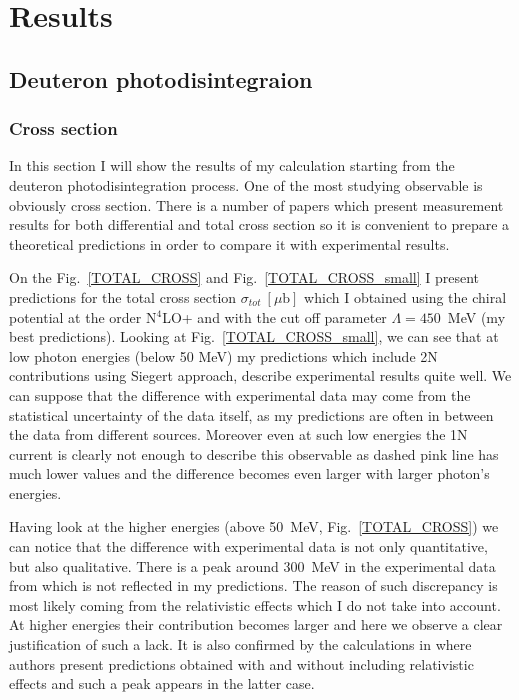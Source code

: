 \chapter{Results}

\section{Deuteron photodisintegraion}

    \subsection{Cross section}
    In this section I will show the results of my calculation starting from the
    deuteron photodisintegration process. One of the most
    studying observable is obviously cross section. There is
    a number of papers which present 
    measurement results for both differential and total cross section
    \cite{BOSMAN1979,ARENDS1984,Skopik1974, Moreh1989, Birenbaum1985, Bernabei1986, rachek2007,Ying_Experiment_Deut, DeSanctis_Experiment_Deut} so it is convenient 
    to prepare a theoretical predictions in order to compare 
    it with experimental results.

    On the Fig.~\ref{TOTAL_CROSS} and Fig.~\ref{TOTAL_CROSS_small} 
    I present predictions for the
    total cross section $\sigma_{tot}~[\mu\text{b}]$ which I obtained
    using the chiral potential at the order N$^4$LO+ and with 
    the cut off parameter $\Lambda=450$~MeV (my best predictions).
    Looking at Fig.~\ref{TOTAL_CROSS_small}, we can see that at low photon energies
    (below 50 MeV) my predictions which include 2N contributions
    using Siegert approach, describe experimental results quite well.
    We can suppose that the difference with experimental data may come from 
    the statistical uncertainty of  the data itself, as my predictions
    are often in between the data from different sources.
    Moreover even at such low energies the 1N current is clearly not enough
    to describe this observable as dashed pink line has much lower values and
    the difference becomes even larger with larger photon's energies. 

    Having look at the higher energies (above 50~MeV, Fig.~\ref{TOTAL_CROSS})
    we can notice that the difference with experimental data is not only 
    quantitative, but also qualitative.  There is a peak around 300~MeV
    in the experimental data from \cite{Bernabei1986} which is not
    reflected in my predictions. The reason of such discrepancy 
    is most likely coming from the relativistic effects
    which I do not take into account. At higher energies their contribution
    becomes larger and here we observe a clear justification of such a lack.
    It is also confirmed by the calculations in \cite{ArenhovelPhotodisint1991}
    where authors present predictions obtained with and without including
    relativistic effects and such a peak appears in the latter case. 
    
